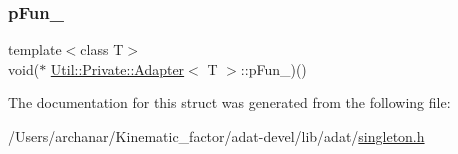 \subsubsection{\texorpdfstring{pFun\_}{pFun\_}}
{\footnotesize\ttfamily template$<$class T$>$ \\
void($\ast$ \mbox{\hyperlink{structUtil_1_1Private_1_1Adapter}{Util\+::\+Private\+::\+Adapter}}$<$ T $>$\+::p\+Fun\+\_\+)()}



The documentation for this struct was generated from the following file\+:\begin{DoxyCompactItemize}
\item 
/\+Users/archanar/\+Kinematic\+\_\+factor/adat-\/devel/lib/adat/\mbox{\hyperlink{adat-devel_2lib_2adat_2singleton_8h}{singleton.\+h}}\end{DoxyCompactItemize}
